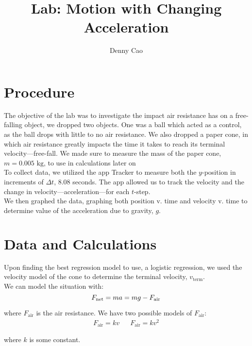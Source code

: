 \documentclass{article}
\begin{document}
\title{Lab: Motion with Changing Acceleration}
\author{Denny Cao}

\maketitle

\section{Procedure}
The objective of the lab was to investigate the impact air resistance has on a free-falling object, 
we dropped two objects. One was a ball which acted as a control, as the ball drops with little to no air resistance. 
We also dropped a paper cone, in which air resistance greatly impacts the time it takes to reach its terminal velocity—free-fall.
We made sure to measure the mass of the paper cone, $m = 0.005 \text{ kg}$, to use in calculations later on \\

\noindent
To collect data, we utilized the app Tracker to measure both the $y$-position in increments of $\Delta t$, 8.08 seconds.
The app allowed us to track the velocity and the change in velocity—acceleration—for each $t$-step. \\

\noindent
We then graphed the data, graphing both position v. time and velocity v. time to 
determine value of the acceleration due to gravity, $g$.

\section{Data and Calculations}
Upon finding the best regression model to use, a logistic regression, 
we used the velocity model of the cone to determine the terminal velocity, $v_\text{term}$. \\

\noindent
We can model the situation with:
$$
F_\text{net} = ma = mg - F_\text{air} \\
$$

\noindent
where $F_\text{air}$ is the air resistance. We have two possible models of $F_\text{air}$:
\begin{align*}
    F_\text{air} = kv && F_\text{air} = kv^2
\end{align*}

\noindent
where $k$ is some constant. \\
\end{document}

